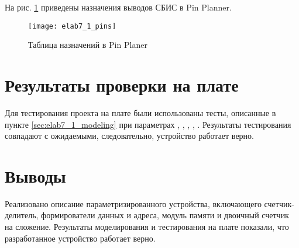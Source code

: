 На рис. \ref{fig:elab7_1_pins} приведены назначения выводов СБИС в Pin Planner.

\begin{figure}[H]
\begin{center}
	\texttt{[image: elab7\_1\_pins]}
	\caption{Таблица назначений в Pin Planer}
	\label{fig:elab7_1_pins}
\end{center}
\end{figure}

\section{Результаты проверки на плате}

Для тестирования проекта на плате были использованы тесты, описанные в пункте \ref{sec:elab7_1_modeling} при параметрах , , , , . Результаты тестирования совпадают с ожидаемыми, следовательно, устройство работает верно.

\section{Выводы}

Реализовано описание параметризированного устройства, включающего счетчик-делитель, формирователи данных и адреса, модуль памяти и двоичный счетчик на сложение. Результаты моделирования и тестирования на плате показали, что разработанное устройство работает верно.

